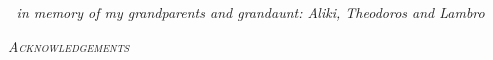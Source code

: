\documentclass[letterpaper, 12pt, oneside]{book}
\begin{document}


\clearpage
{\textcolor{white}{.}   }
\vspace{1.5in}
\thispagestyle{plain}
{\center \em in memory of my grandparents and grandaunt: Aliki, Theodoros and Lambro %
\endcenter} 


\clearpage
\begin{center}
{\em \textsc{Acknowledgements}}
\end{center}
\vspace{0.20in}

\tableofcontents

\mainmatter








\begin{appendices}

\end{appendices}




\nocite{Pfenning2009a, Pfenning2009b}




\end{document}
